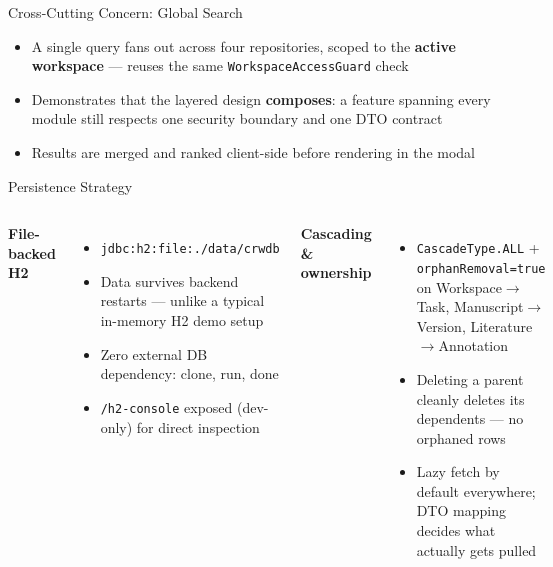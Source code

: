 \documentclass[aspectratio=169, 10pt]{beamer}
\begin{document}
\begin{frame}{Cross-Cutting Concern: Global Search}
  \centering
  \vspace{0.4cm}
  \begin{itemize}\setlength\itemsep{5pt}
    \item A single query fans out across four repositories, scoped to the \textbf{active workspace} --- reuses the same \texttt{WorkspaceAccessGuard} check
    \item Demonstrates that the layered design \textbf{composes}: a feature spanning every module still respects one security boundary and one DTO contract
    \item Results are merged and ranked client-side before rendering in the modal
  \end{itemize}
\end{frame}

\begin{frame}{Persistence Strategy}
  \begin{columns}[T,onlytextwidth]
      \textbf{File-backed H2}
      \begin{itemize}\setlength\itemsep{6pt}
        \item \texttt{jdbc:h2:file:./data/crwdb}
        \item Data survives backend restarts --- unlike a typical in-memory H2 demo setup
        \item Zero external DB dependency: clone, run, done
        \item \texttt{/h2-console} exposed (dev-only) for direct inspection
      \end{itemize}
      \textbf{Cascading \& ownership}
      \begin{itemize}\setlength\itemsep{6pt}
        \item \texttt{CascadeType.ALL} + \texttt{orphanRemoval=true} on Workspace$\to$Task, Manuscript$\to$Version, Literature$\to$Annotation
        \item Deleting a parent cleanly deletes its dependents --- no orphaned rows
        \item Lazy fetch by default everywhere; DTO mapping decides what actually gets pulled
      \end{itemize}
  \end{columns}
\end{frame}
\end{document}
